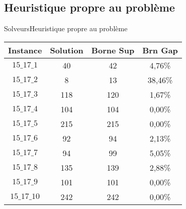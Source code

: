 \documentclass[10pt]{beamer}
\begin{document}
\subsection{Heuristique propre au problème}
\begin{frame}{Solveurs}{Heuristique propre au problème}

\begin{center}
      \begin{tabular}{|c|c|c|c|}
      \hline 
        Instance & Solution & Borne Sup & Brn Gap  \\ \hline
$15\_17\_1$ & 40 &  42 &  4,76\% \\ \hline
$15\_17\_2$ & 8 & 13 &  38,46\% \\ \hline
$15\_17\_3$ & 118 & 120 & 1,67\% \\ \hline
$15\_17\_4$ & 104 & 104 & 0,00\% \\ \hline
$15\_17\_5$ & 215 & 215 & 0,00\% \\ \hline
$15\_17\_6$ & 92 &  94 &  2,13\% \\ \hline
$15\_17\_7$ & 94 &  99 &  5,05\% \\ \hline
$15\_17\_8$ & 135 & 139 & 2,88\% \\ \hline
$15\_17\_9$ & 101 & 101 & 0,00\% \\ \hline
$15\_17\_10$ & 242 & 242 & 0,00\% \\ \hline
      \end{tabular}
      \end{center}
\end{frame}
\end{document}
